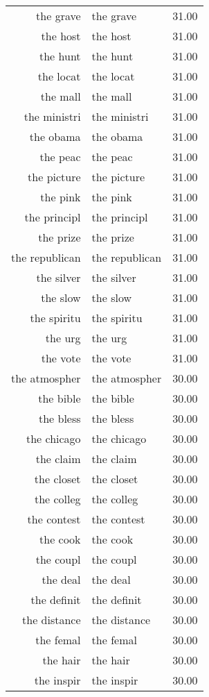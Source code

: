 \begin{table}[ht]
\begin{tabular}{rlr}
  the grave & the grave & 31.00 \\ 
  the host & the host & 31.00 \\ 
  the hunt & the hunt & 31.00 \\ 
  the locat & the locat & 31.00 \\ 
  the mall & the mall & 31.00 \\ 
  the ministri & the ministri & 31.00 \\ 
  the obama & the obama & 31.00 \\ 
  the peac & the peac & 31.00 \\ 
  the picture & the picture & 31.00 \\ 
  the pink & the pink & 31.00 \\ 
  the principl & the principl & 31.00 \\ 
  the prize & the prize & 31.00 \\ 
  the republican & the republican & 31.00 \\ 
  the silver & the silver & 31.00 \\ 
  the slow & the slow & 31.00 \\ 
  the spiritu & the spiritu & 31.00 \\ 
  the urg & the urg & 31.00 \\ 
  the vote & the vote & 31.00 \\ 
  the atmospher & the atmospher & 30.00 \\ 
  the bible & the bible & 30.00 \\ 
  the bless & the bless & 30.00 \\ 
  the chicago & the chicago & 30.00 \\ 
  the claim & the claim & 30.00 \\ 
  the closet & the closet & 30.00 \\ 
  the colleg & the colleg & 30.00 \\ 
  the contest & the contest & 30.00 \\ 
  the cook & the cook & 30.00 \\ 
  the coupl & the coupl & 30.00 \\ 
  the deal & the deal & 30.00 \\ 
  the definit & the definit & 30.00 \\ 
  the distance & the distance & 30.00 \\ 
  the femal & the femal & 30.00 \\ 
  the hair & the hair & 30.00 \\ 
  the inspir & the inspir & 30.00 \\ 

\end{tabular}
\end{table}
